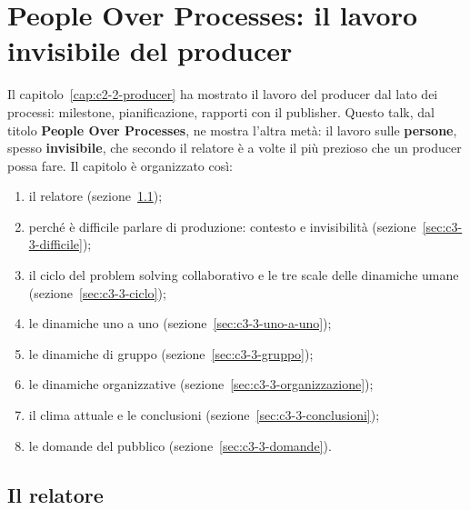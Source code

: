 
\chapter[People Over Processes]{People Over Processes: il lavoro invisibile del
producer}
\label{cap:c3-3-people-over-processes}

Il capitolo~\ref{cap:c2-2-producer} ha mostrato il lavoro del producer dal lato dei
processi: milestone, pianificazione, rapporti con il publisher. Questo talk, dal
titolo \textbf{People Over Processes}, ne mostra l'altra metà: il lavoro sulle
\textbf{persone}, spesso \textbf{invisibile}, che secondo il relatore è a volte il
più prezioso che un producer possa fare. Il capitolo è organizzato così:
\begin{enumerate}
  \item il relatore (sezione~\ref{sec:c3-3-relatore});
  \item perché è difficile parlare di produzione: contesto e invisibilità
        (sezione~\ref{sec:c3-3-difficile});
  \item il ciclo del problem solving collaborativo e le tre scale delle dinamiche
        umane (sezione~\ref{sec:c3-3-ciclo});
  \item le dinamiche uno a uno (sezione~\ref{sec:c3-3-uno-a-uno});
  \item le dinamiche di gruppo (sezione~\ref{sec:c3-3-gruppo});
  \item le dinamiche organizzative (sezione~\ref{sec:c3-3-organizzazione});
  \item il clima attuale e le conclusioni (sezione~\ref{sec:c3-3-conclusioni});
  \item le domande del pubblico (sezione~\ref{sec:c3-3-domande}).
\end{enumerate}

\section{Il relatore}
\label{sec:c3-3-relatore}

